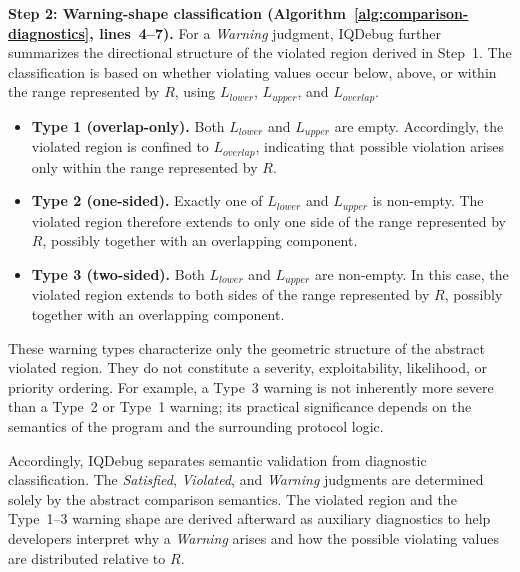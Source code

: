 \documentclass[11pt,oneside]{report}
\theoremstyle{plain}
\theoremstyle{definition}
\theoremstyle{remark}
\begin{document}
\smallskip
\noindent\textbf{Step 2: Warning-shape classification
(Algorithm~\ref{alg:comparison-diagnostics}, lines~4--7).}
For a \textit{Warning} judgment, IQDebug further summarizes the directional
structure of the violated region derived in Step~1.
The classification is based on whether violating values occur below, above,
or within the range represented by \(R\), using
\(L_{\mathit{lower}}\), \(L_{\mathit{upper}}\), and
\(L_{\mathit{overlap}}\).

\begin{itemize}
    \item \textbf{Type 1 (overlap-only).}
    Both \(L_{\mathit{lower}}\) and \(L_{\mathit{upper}}\) are empty.
    Accordingly, the violated region is confined to
    \(L_{\mathit{overlap}}\), indicating that possible violation arises only
    within the range represented by \(R\).
    \item \textbf{Type 2 (one-sided).}
    Exactly one of \(L_{\mathit{lower}}\) and \(L_{\mathit{upper}}\) is
    non-empty.
    The violated region therefore extends to only one side of the range
    represented by \(R\), possibly together with an overlapping component.
    \item \textbf{Type 3 (two-sided).}
    Both \(L_{\mathit{lower}}\) and \(L_{\mathit{upper}}\) are non-empty.
    In this case, the violated region extends to both sides of the range
    represented by \(R\), possibly together with an overlapping component.
\end{itemize}

These warning types characterize only the geometric structure of the abstract
violated region.
They do not constitute a severity, exploitability, likelihood, or priority
ordering.
For example, a Type~3 warning is not inherently more severe than a Type~2 or
Type~1 warning; its practical significance depends on the semantics of the
program and the surrounding protocol logic.

Accordingly, IQDebug separates semantic validation from diagnostic
classification.
The \textit{Satisfied}, \textit{Violated}, and \textit{Warning} judgments are
determined solely by the abstract comparison semantics.
The violated region and the Type~1--3 warning shape are derived afterward as
auxiliary diagnostics to help developers interpret why a
\textit{Warning} arises and how the possible violating values are distributed
relative to \(R\).
\end{document}
